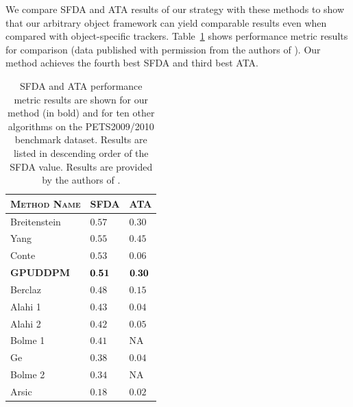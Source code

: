 \documentclass[twocolumn, final]{svjour3}
\begin{document}
We compare SFDA and ATA results of our strategy with these methods to show that our arbitrary object framework can yield comparable results even when compared with object-specific trackers. Table~\ref{benchmark_results_table} shows performance metric results for comparison (data published with permission from the authors of \cite{ellis_2010}). Our method achieves the fourth best SFDA and third best ATA.

\begin{table}
\begin{tabular}[!] {| l | l | l |}
  \hline
  \textsc{Method Name} & \textsc{SFDA}  & \textsc{ATA} \\ \hline \hline
  Breitenstein \cite{breitenstein2009markovian} & $ 0.57 $ & $0.30$ \\ \hline
  Yang \cite{yang2009probabilistic} & $ 0.55 $ & $0.45$ \\ \hline
  Conte \cite{conte2010performance} & $ 0.53  $ & $0.06$ \\ \hline
  \textbf{GPUDDPM} & $ \bold{0.51} $ & $\bold{0.30}$ \\ \hline
  Berclaz \cite{berclaz2009multiple} & $ 0.48 $ & $0.15$ \\ \hline
  Alahi 1 \cite{alahi2009sparsity} & $ 0.43 $ & $0.04$ \\ \hline
  Alahi 2 \cite{alahi2009sparsity} & $ 0.42 $ & $0.05$ \\ \hline
  Bolme 1 \cite{bolme2009simple} & $ 0.41 $ & NA \\ \hline
  Ge \cite{ge2009evaluation} & $ 0.38 $ & $0.04$ \\ \hline
  Bolme 2 \cite{bolme2009simple} & $ 0.34 $ & NA \\ \hline
  Arsic \cite{arsic2009multi} & $ 0.18 $ & $0.02$ \\
  \hline
\end{tabular}
\caption{SFDA and ATA performance metric results are shown for our method (in bold) and for ten other algorithms on the PETS2009/2010 benchmark dataset. Results are listed in descending order of the SFDA value. Results are provided by the authors of \cite{ellis_2010}.}
\label{benchmark_results_table}
\end{table}
%
%
\end{document}
